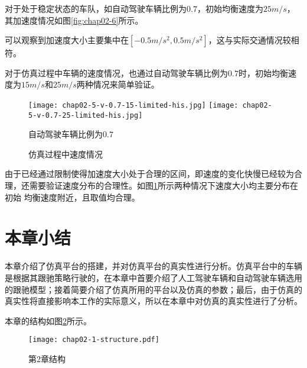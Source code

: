 对于处于稳定状态的车队，如自动驾驶车辆比例为$0.7$，初始均衡速度为$25m/s$，其加速度情况如图\ref{fig:chap02-6}所示。

可以观察到加速度大小主要集中在$[-0.5m/s^2, 0.5m/s^2]$，这与实际交通情况较相符。

对于仿真过程中车辆的速度情况，也通过自动驾驶车辆比例为$0.7$时，初始均衡速度为$15m/s$和$25m/s$两种情况来简单验证。

\begin{figure}
  \centering
    {\texttt{[image: chap02-5-v-0.7-15-limited-his.jpg]}}
    {\texttt{[image: chap02-5-v-0.7-25-limited-his.jpg]}}
  \caption*{自动驾驶车辆比例为$0.7$}
  \caption{仿真过程中速度情况}
  \label{fig:chap02-7}
\end{figure}

由于已经通过限制使得加速度大小处于合理的区间，即速度的变化快慢已经较为合理，还需要验证速度分布的合理性。如图\ref{fig:chap02-7}所示两种情况下速度大小均主要分布在初始
均衡速度附近，且取值均合理。

\section{本章小结}

本章介绍了仿真平台的搭建，并对仿真平台的真实性进行分析。仿真平台中的车辆是根据其跟驰策略行驶的，在本章中首要介绍了人工驾驶车辆和自动驾驶车辆选用
的跟驰模型；接着简要介绍了仿真所用的平台以及仿真的参数；最后，由于仿真的真实性将直接影响本工作的实际意义，所以在本章中对仿真的真实性进行了分析。

本章的结构如图\ref{fig:chap02-1-logic}所示。

\begin{figure}
  \centering
  \texttt{[image: chap02-1-structure.pdf]}
  \caption{第2章结构}
  \label{fig:chap02-1-logic}
\end{figure}
